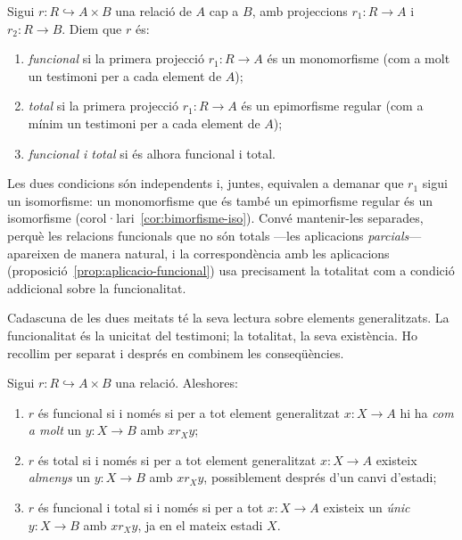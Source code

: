 \begin{definicio}\label{def:relacio-funcional}
Sigui \(r\colon R\hookrightarrow A\times B\) una relació de \(A\) cap a
\(B\), amb projeccions \(r_1\colon R\to A\) i \(r_2\colon R\to B\). Diem
que \(r\) és:
\begin{enumerate}
\item \emph{funcional} si la primera projecció \(r_1\colon R\to A\) és un
monomorfisme (com a molt un testimoni per a cada element de \(A\));
\item \emph{total} si la primera projecció \(r_1\colon R\to A\) és un
epimorfisme regular (com a mínim un testimoni per a cada element de
\(A\));
\item \emph{funcional i total} si és alhora funcional i total.
\end{enumerate}
\end{definicio}

Les dues condicions són independents i, juntes, equivalen a demanar que
\(r_1\) sigui un isomorfisme: un monomorfisme que és també un epimorfisme
regular és un isomorfisme (corol·lari~\ref{cor:bimorfisme-iso}). Convé
mantenir-les separades, perquè les relacions funcionals que no són totals
---les aplicacions \emph{parcials}--- apareixen de manera natural, i la
correspondència amb les aplicacions (proposició~\ref{prop:aplicacio-funcional})
usa precisament la totalitat com a condició addicional sobre la
funcionalitat.

Cadascuna de les dues meitats té la seva lectura sobre elements
generalitzats. La funcionalitat és la unicitat del testimoni; la
totalitat, la seva existència. Ho recollim per separat i després en
combinem les conseqüències.

\begin{proposicio}\label{prop:funcional-lectura}
Sigui \(r\colon R\hookrightarrow A\times B\) una relació. Aleshores:
\begin{enumerate}
\item \(r\) és funcional si i només si per a tot element generalitzat
\(x\colon X\to A\) hi ha \emph{com a molt} un \(y\colon X\to B\) amb
\(x\mathrel{r_X}y\);
\item \(r\) és total si i només si per a tot element generalitzat
\(x\colon X\to A\) existeix \emph{almenys} un \(y\colon X\to B\) amb
\(x\mathrel{r_X}y\), possiblement després d'un canvi d'estadi;
\item \(r\) és funcional i total si i només si per a tot \(x\colon X\to A\)
existeix un \emph{únic} \(y\colon X\to B\) amb \(x\mathrel{r_X}y\), ja en
el mateix estadi \(X\).
\end{enumerate}
\end{proposicio}

